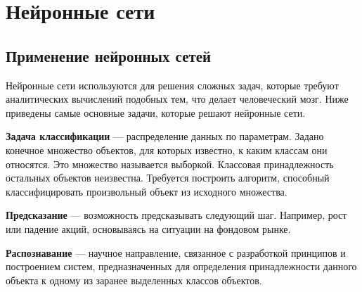 \newpage

\chapter{Нейронные сети}
\section{Применение нейронных сетей}

\indent\indent Нейронные сети используются для решения сложных задач, которые требуют аналитических вычислений подобных тем, что делает человеческий мозг. Ниже приведены самые основные задачи, которые решают нейронные сети.

 \textbf{Задача классификации} — распределение данных по параметрам. Задано конечное множество объектов, для которых известно, к каким классам они относятся. Это множество называется выборкой. Классовая принадлежность остальных объектов неизвестна. Требуется построить алгоритм, способный классифицировать произвольный объект из исходного множества.

 \textbf{Предсказание} — возможность предсказывать следующий шаг. Например, рост или падение акций, основываясь на ситуации на фондовом рынке. 

 \textbf{Распознавание} — научное направление, связанное с разработкой принципов и построением систем, предназначенных для определения принадлежности данного объекта к одному из заранее выделенных классов объектов.

